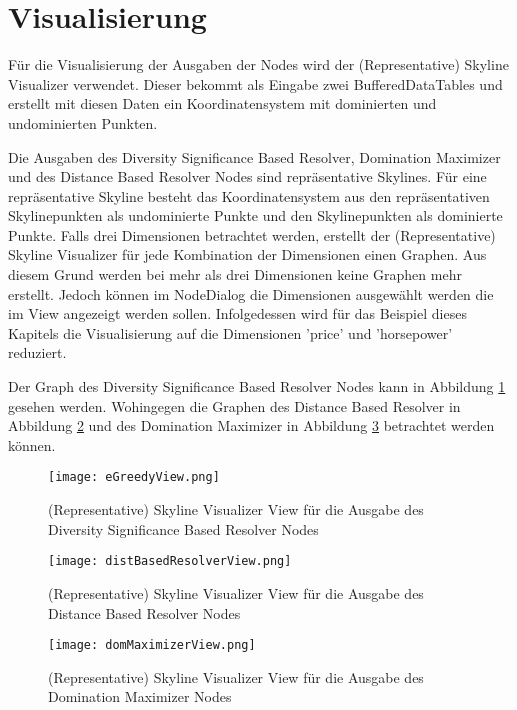 {\section{Visualisierung}
\label{ch:Evaluierung:sec:visualize}
Für die Visualisierung der Ausgaben der Nodes wird der (Representative) Skyline Visualizer verwendet. Dieser bekommt als Eingabe zwei BufferedDataTables und erstellt mit diesen Daten ein Koordinatensystem mit dominierten und undominierten Punkten.  

Die Ausgaben des Diversity Significance Based Resolver, Domination Maximizer und des Distance Based Resolver Nodes sind repräsentative Skylines. Für eine repräsentative Skyline besteht das Koordinatensystem aus den repräsentativen Skylinepunkten als undominierte Punkte und den Skylinepunkten als dominierte Punkte. Falls drei Dimensionen betrachtet werden, erstellt der (Representative) Skyline Visualizer für jede Kombination der Dimensionen einen Graphen. Aus diesem Grund werden bei mehr als drei Dimensionen keine Graphen mehr erstellt. Jedoch können im NodeDialog die Dimensionen ausgewählt werden die im View angezeigt werden sollen. Infolgedessen wird für das Beispiel dieses Kapitels die Visualisierung auf die Dimensionen 'price' und 'horsepower' reduziert.

Der Graph des Diversity Significance Based Resolver Nodes kann in Abbildung \ref{img:eGreedyView} gesehen werden. Wohingegen die Graphen des Distance Based Resolver in Abbildung \ref{img:distBasedResolverView} und des Domination Maximizer in Abbildung \ref{img:domMaximizerView} betrachtet werden können. 
	
	\begin{figure}[H]
	\centering
	\texttt{[image: eGreedyView.png]}
	\caption{(Representative) Skyline Visualizer View für die Ausgabe des Diversity Significance Based Resolver Nodes}
	\label{img:eGreedyView}
\end{figure} 

\begin{figure}[H]
	\centering
	\texttt{[image: distBasedResolverView.png]}
	\caption{(Representative) Skyline Visualizer View für die Ausgabe des Distance Based Resolver Nodes}
	\label{img:distBasedResolverView}
\end{figure} 

\begin{figure}[H]
	\centering
	\texttt{[image: domMaximizerView.png]}
	\caption{(Representative) Skyline Visualizer View für die Ausgabe des Domination Maximizer Nodes}
	\label{img:domMaximizerView}
\end{figure} 

}
